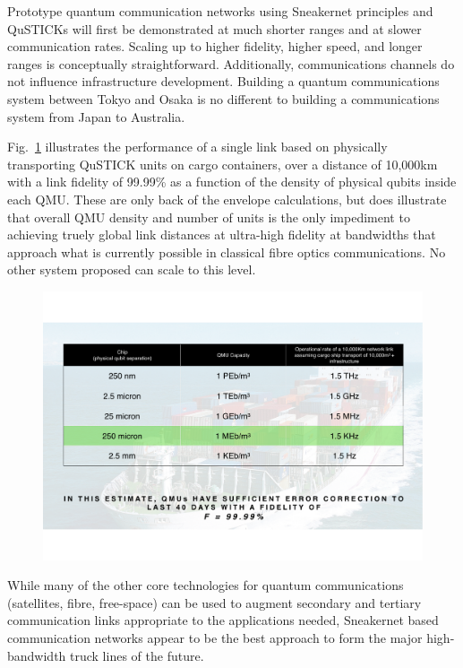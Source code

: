 \documentclass[twocolumn, aps, rmp, amsmath, amssymb, nofootinbib, superscriptaddress, longbibliography, floatfix, table-of-contents, eqsecnum]{revtex4-2}
\begin{document}
Prototype quantum communication networks using Sneakernet principles and QuSTICKs will first be demonstrated at much shorter ranges and at slower communication rates. Scaling up to higher fidelity, higher speed, and longer ranges is conceptually straightforward. Additionally, communications channels do not influence infrastructure development. Building a quantum communications system between Tokyo and Osaka is no different to building a communications system from Japan to Australia. 

Fig.~\ref{fig:link} illustrates the performance of a single link based on physically transporting QuSTICK units on cargo containers, over a distance of 10,000km with a link fidelity of 99.99\% as a function of the density of physical qubits inside each QMU. These are only back of the envelope calculations, but does illustrate that overall QMU density and number of units is the only impediment to achieving truely global link distances at ultra-high fidelity at bandwidths that approach what is currently possible in classical fibre optics communications. No other system proposed can scale to this level.
 
\begin{figure}[htbp!]
	\includegraphics[clip=true, width=\columnwidth]{link}
	\caption{} \label{fig:link}
\end{figure}

While many of the other core technologies for quantum communications (satellites, fibre, free-space) can be used to augment secondary and tertiary communication links appropriate to the applications needed, Sneakernet based communication networks appear to be the best approach to form the major high-bandwidth truck lines of the future. 



\printindex
\end{document}
